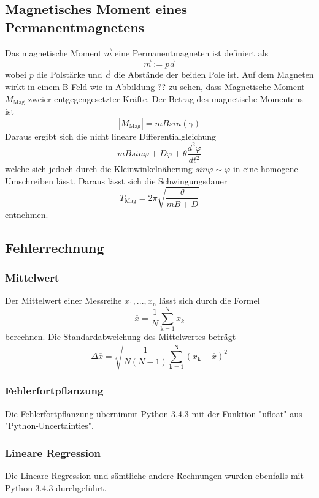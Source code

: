 \subsection{Magnetisches Moment eines Permanentmagnetens}
Das magnetische Moment $\vec{m}$  eine Permanentmagneten ist definiert als 
\begin{equation}
  \vec{m} := p \vec{a}
  \label{eqn:m}
\end{equation}
wobei $p$ die Polstärke und $\vec{a}$ die Abstände der beiden Pole ist. Auf dem Magneten wirkt in einem B-Feld wie in Abbildung ?? zu sehen, dass Magnetische Moment $M_\text{Mag}$ zweier entgegengesetzter Kräfte. Der Betrag des magnetische Momentens ist 
\begin{equation}
  |M_\text{Mag}| = m B sin(\gamma)
  \label{eqn:MM}
\end{equation}
Daraus ergibt sich die nicht lineare Differentialgleichung
\begin{equation}
  mBsin \varphi + D \varphi + \theta \frac{d^2 \varphi}{dt^2}
  \label{eqn:idgl}
\end{equation} welche sich jedoch durch die Kleinwinkelnäherung $sin \varphi \sim \varphi$ in eine homogene Umschreiben lässt. Daraus lässt sich die Schwingungsdauer 
\begin{equation}
  T_\text{Mag} = 2 \pi \sqrt{\frac{\theta}{mB + D}} 
  \label{eqn:Tmag}
\end{equation}
entnehmen.
\subsection{Fehlerrechnung}
\subsubsection{Mittelwert}
Der Mittelwert einer Messreihe $x_\text{1}, ... ,x_\text{n}$ lässt sich durch die Formel
\begin{equation}
	\overline{x} = \frac{1}{N} \sum_{\text{k}=1}^\text{N} x_k
	\label{eqn:ave}
\end{equation}
berechnen. Die Standardabweichung des Mittelwertes beträgt
\begin{equation}
	\Delta \overline{x} = \sqrt{ \frac{1}{N(N-1)} \sum_{\text{k}=1}^\text{N} (x_\text{k} - \overline{x})^2}
	\label{eqn:std}
\end{equation}

\subsubsection{Fehlerfortpflanzung}
Die Fehlerfortpflanzung übernimmt Python 3.4.3 mit der Funktion "ufloat" aus "Python-Uncertainties".

\subsubsection{Lineare Regression}
Die Lineare Regression und sämtliche andere Rechnungen wurden ebenfalls mit Python 3.4.3 durchgeführt.
